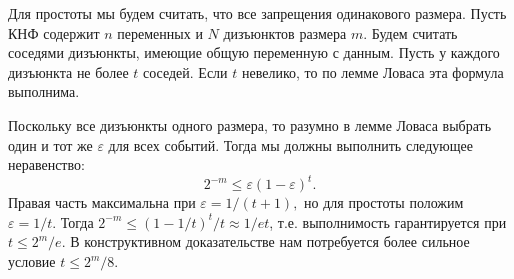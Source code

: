 \documentclass[12pt]{article}
\theoremstyle{definition}
\theoremstyle{plain}
\theoremstyle{remark}
\begin{document}
Для простоты мы будем считать, что все запрещения одинакового размера.
Пусть КНФ содержит $n$ переменных и $N$ дизъюнктов размера $m$. Будем
считать соседями дизъюнкты, имеющие общую переменную с данным. Пусть у
каждого дизъюнкта не более $t$ соседей. Если $t$ невелико,
то по лемме Ловаса эта формула выполнима.

Поскольку все дизъюнкты одного размера, то разумно в лемме Ловаса выбрать
один и тот же $\varepsilon$ для всех событий. Тогда мы должны выполнить следующее неравенство:
\[
    2^{-m} \le \varepsilon(1-\varepsilon)^t.
\]
Правая часть максимальна при $\varepsilon = 1/(t+1),$ но для простоты положим $\varepsilon = 1/t$. 
Тогда $2^{-m}\le (1-1/t)^t/t \approx 1/et$, т.е. выполнимость гарантируется при $t\le 2^m/e$.
В конструктивном доказательстве нам потребуется более сильное условие $t\le 2^m/8$.
\end{document}
